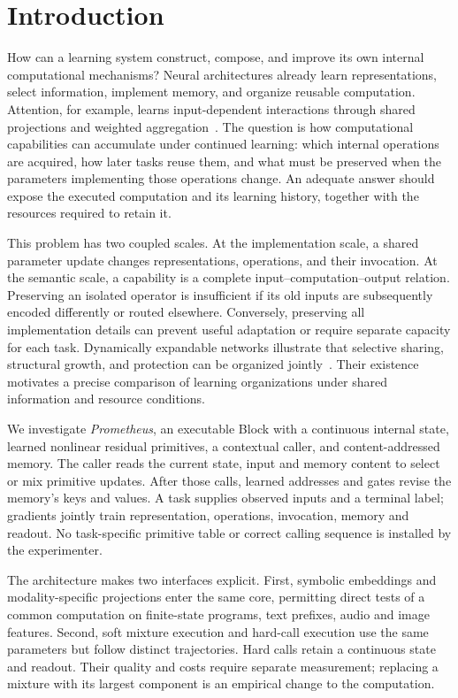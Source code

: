 \section{Introduction}
\label{sec:introduction}

How can a learning system construct, compose, and improve its own internal
computational mechanisms? Neural architectures already learn representations,
select information, implement memory, and organize reusable computation.
Attention, for example, learns input-dependent interactions through shared
projections and weighted aggregation~\cite{vaswani2017attention}. The question
is how computational capabilities can accumulate under continued learning:
which internal operations are acquired, how later tasks reuse them, and what
must be preserved when the parameters implementing those operations change.
An adequate answer should expose the executed computation and its learning
history, together with the resources required to retain it.

This problem has two coupled scales. At the implementation scale, a shared
parameter update changes representations, operations, and their invocation.
At the semantic scale, a capability is a complete input--computation--output
relation. Preserving an isolated operator is insufficient if its old inputs
are subsequently encoded differently or routed elsewhere. Conversely,
preserving all implementation details can prevent useful adaptation or require
separate capacity for each task. Dynamically expandable networks illustrate
that selective sharing, structural growth, and protection can be organized
jointly~\cite{yoon2018lifelong}. Their existence motivates a precise comparison
of learning organizations under shared information and resource conditions.

We investigate \emph{Prometheus}, an executable Block with a continuous internal
state, learned nonlinear residual primitives, a contextual caller, and
content-addressed memory. The caller reads the current state, input and memory
content to select or mix primitive updates. After those calls, learned
addresses and gates revise the memory's keys and values. A task supplies
observed inputs and a terminal label; gradients jointly train representation,
operations, invocation, memory and readout. No task-specific primitive table
or correct calling sequence is installed by the experimenter.

The architecture makes two interfaces explicit. First, symbolic embeddings
and modality-specific projections enter the same core, permitting direct tests
of a common computation on finite-state programs, text prefixes, audio and
image features. Second, soft mixture execution and hard-call execution use
the same parameters but follow distinct trajectories. Hard calls retain a
continuous state and readout. Their quality and costs require separate
measurement; replacing a mixture with its largest component is an empirical
change to the computation.

